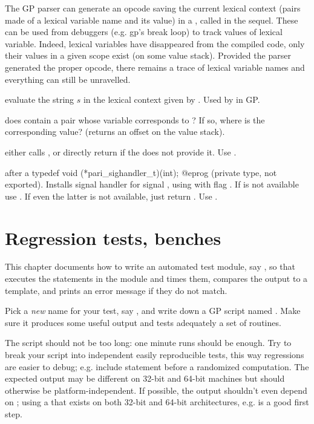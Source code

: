 The GP parser can generate an opcode saving the current lexical context
(pairs made of a lexical variable name and its value) in a , called
 in the sequel. These can be used from debuggers (e.g. gp's break
loop) to track values of lexical variable. Indeed, lexical variables have
disappeared from the compiled code, only their values in a given scope exist
(on some value stack). Provided the parser generated the proper opcode, there
remains a trace of lexical variable names and everything can still be
unravelled.

 evaluate the string $s$
in the lexical context given by .  Used by  in GP.

 does  contain
a pair whose variable corresponds to ? If so, where is the
corresponding value? (returns an offset on the value stack).


 either calls , or directly
return  if the  does not provide it. Use .

 after a
\bprog
  typedef void (*pari_sighandler_t)(int);
@eprog\noindent
(private type, not exported). Installs signal handler  for
signal , using  with flag . If
 is not available use . If even the latter is not
available, just return . Use .

\chapter{Regression tests, benches}

This chapter documents how to write an automated test module, say ,
so that  executes the statements in the  module
and times them, compares the output to a template, and prints an error
message if they do not match.

\item Pick a \emph{new} name for your test, say , and write down a
GP script named . Make sure it produces some useful output and tests
adequately a set of routines.

\item The script should not be too long: one minute runs should be enough.
Try to break your script into independent easily reproducible tests, this way
regressions are easier to debug; e.g. include  statement before
a randomized computation. The expected output may be different on 32-bit and
64-bit machines but should otherwise be platform-independent. If possible, the
output shouldn't even depend on ; using a 
that exists on both 32-bit and 64-bit architectures, e.g.  is a
good first step.

